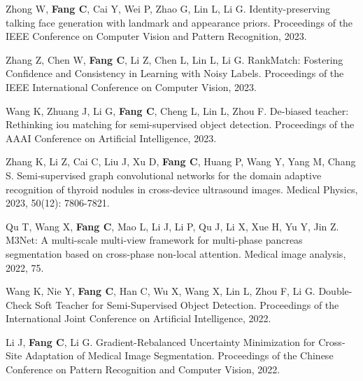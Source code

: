 \documentclass[a4paper,36pt]{article}
\newcommand{\tb}[1]{\textbf{#1}}
\newcommand{\resumeItemWithoutTitle}[1]{
  \item\justifying\small{
    {#1 \vspace{-2pt}}
  }
}
\begin{document}
\resumeItemWithoutTitle{Zhong W, \tb{Fang C}, Cai Y, Wei P, Zhao G, Lin L, Li G. Identity-preserving talking face generation with landmark and appearance priors. Proceedings of the IEEE Conference on Computer Vision and Pattern Recognition, 2023. }

\resumeItemWithoutTitle{Zhang Z, Chen W, \tb{Fang C}, Li Z, Chen L, Lin L, Li G. RankMatch: Fostering Confidence and Consistency in Learning with Noisy Labels. Proceedings of the IEEE International Conference on Computer Vision, 2023. }

\resumeItemWithoutTitle{Wang K, Zhuang J, Li G, \tb{Fang C}, Cheng L, Lin L, Zhou F. De-biased teacher: Rethinking iou matching for semi-supervised object detection. Proceedings of the AAAI Conference on Artificial Intelligence, 2023.}

\resumeItemWithoutTitle{Zhang K, Li Z, Cai C, Liu J, Xu D, \tb{Fang C}, Huang P, Wang Y, Yang M, Chang S. Semi‐supervised graph convolutional networks for the domain adaptive recognition of thyroid nodules in cross‐device ultrasound images. Medical Physics, 2023, 50(12): 7806-7821.}

\resumeItemWithoutTitle{Qu T, Wang X, \tb{Fang C}, Mao L, Li J, Li P, Qu J, Li X, Xue H, Yu Y, Jin Z. M3Net: A multi-scale multi-view framework for multi-phase pancreas segmentation based on cross-phase non-local attention. Medical image analysis, 2022, 75.}


\resumeItemWithoutTitle{Wang K, Nie Y, \tb{Fang C}, Han C, Wu X, Wang X, Lin L, Zhou F, Li G. Double-Check Soft Teacher for Semi-Supervised Object Detection. Proceedings of the International Joint Conference on Artificial Intelligence, 2022.}

\resumeItemWithoutTitle{Li J, \tb{Fang C}, Li G. Gradient-Rebalanced Uncertainty Minimization for Cross-Site Adaptation of Medical Image Segmentation. Proceedings of the Chinese Conference on Pattern Recognition and Computer Vision, 2022. }

\end{document}
